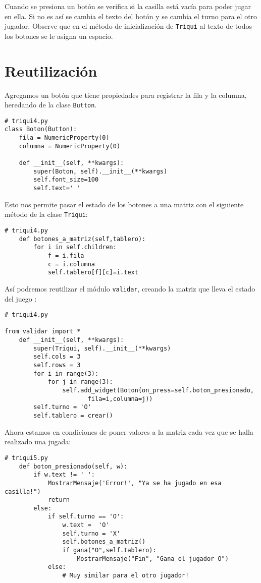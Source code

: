 Cuando se presiona un botón se verifica si la casilla está vacía para poder jugar en 
ella. Si no es así se cambia el texto del botón y se cambia el turno para el otro 
jugador. Observe que en el método de inicialización de \texttt{Triqui} al texto de todos los 
botones se le asigna un espacio.

\section{Reutilización}

Agregamos un botón que tiene propiedades para 
registrar la fila y la columna, heredando de la 
clase \texttt{Button}.

\beforeverb
\begin{verbatim}
# triqui4.py
class Boton(Button):
    fila = NumericProperty(0)
    columna = NumericProperty(0)
    
    def __init__(self, **kwargs):      
        super(Boton, self).__init__(**kwargs)
        self.font_size=100
        self.text=' '
\end{verbatim}
\afterverb
        
Esto nos permite pasar el estado de los botones a una matriz con 
el siguiente método de la clase \texttt{Triqui}:

\beforeverb
\begin{verbatim}
# triqui4.py
    def botones_a_matriz(self,tablero):
        for i in self.children:
            f = i.fila
            c = i.columna
            self.tablero[f][c]=i.text
\end{verbatim}
\afterverb

Así podremos reutilizar el módulo \texttt{validar}, creando la matriz
que lleva el estado del juego :

\beforeverb
\begin{verbatim}
# triqui4.py

from validar import *
    def __init__(self, **kwargs):
        super(Triqui, self).__init__(**kwargs)
        self.cols = 3
        self.rows = 3
        for i in range(3):
            for j in range(3):
                self.add_widget(Boton(on_press=self.boton_presionado,
                       fila=i,columna=j))
        self.turno = 'O'
        self.tablero = crear()
\end{verbatim}
\afterverb

Ahora estamos en condiciones de poner valores a la matriz 
cada vez que se halla realizado una jugada:

\beforeverb
\begin{verbatim}
# triqui5.py
    def boton_presionado(self, w):
        if w.text != ' ':
            MostrarMensaje('Error!', "Ya se ha jugado en esa casilla!")
            return
        else:
            if self.turno == 'O':
                w.text =  'O'                
                self.turno = 'X'
                self.botones_a_matriz()
                if gana("O",self.tablero):
                    MostrarMensaje("Fin", "Gana el jugador O")
            else:
                # Muy similar para el otro jugador!
\end{verbatim}
\afterverb

